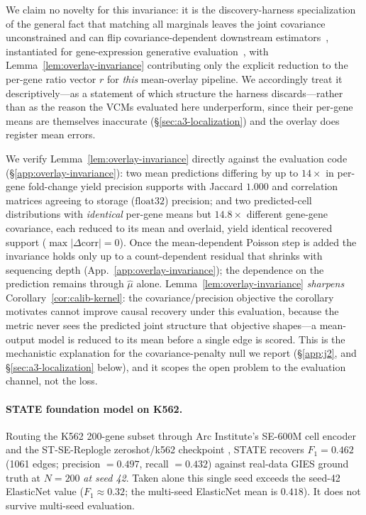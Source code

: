 \documentclass{article}
\theoremstyle{plain}
\theoremstyle{definition}
\theoremstyle{remark}
\begin{document}
We claim no novelty for this invariance: it is the discovery-harness specialization of the general fact that matching all marginals leaves the joint covariance unconstrained and can flip covariance-dependent downstream estimators~\citep{riasat2026marginals}, instantiated for gene-expression generative evaluation~\citep{rubbi2026ggeval}, with Lemma~\ref{lem:overlay-invariance} contributing only the explicit reduction to the per-gene ratio vector $r$ for \emph{this} mean-overlay pipeline. We accordingly treat it descriptively---as a statement of which structure the harness discards---rather than as the reason the VCMs evaluated here underperform, since their per-gene means are themselves inaccurate (\S\ref{sec:a3-localization}) and the overlay does register mean errors.

We verify Lemma~\ref{lem:overlay-invariance} directly against the evaluation code (\S\ref{app:overlay-invariance}): two mean predictions differing by up to $14\times$ in per-gene fold-change yield precision supports with Jaccard $1.000$ and correlation matrices agreeing to storage ($\mathrm{float}32$) precision; and two predicted-cell distributions with \emph{identical} per-gene means but $14.8\times$ different gene-gene covariance, each reduced to its mean and overlaid, yield identical recovered support ($\max|\Delta\mathrm{corr}|=0$). Once the mean-dependent Poisson step is added the invariance holds only up to a count-dependent residual that shrinks with sequencing depth (App.~\ref{app:overlay-invariance}); the dependence on the prediction remains through $\hat\mu$ alone. Lemma~\ref{lem:overlay-invariance} \emph{sharpens} Corollary~\ref{cor:calib-kernel}: the covariance/precision objective the corollary motivates cannot improve causal recovery under this evaluation, because the metric never sees the predicted joint structure that objective shapes---a mean-output model is reduced to its mean before a single edge is scored. This is the mechanistic explanation for the covariance-penalty null we report (\S\ref{app:j2}, and \S\ref{sec:a3-localization} below), and it scopes the open problem to the evaluation channel, not the loss.

\paragraph{STATE foundation model on K562.}
Routing the K562 200-gene subset through Arc Institute's SE-600M cell encoder and the ST-SE-Replogle zeroshot/k562 checkpoint \citep{arc2025state}, STATE recovers $F_1 = 0.462$ (1061 edges; precision $= 0.497$, recall $= 0.432$) against real-data GIES ground truth at $N{=}200$ \emph{at seed 42}. Taken alone this single seed exceeds the seed-42 ElasticNet value ($F_1 \approx 0.32$; the multi-seed ElasticNet mean is $0.418$). It does not survive multi-seed evaluation.
\end{document}
